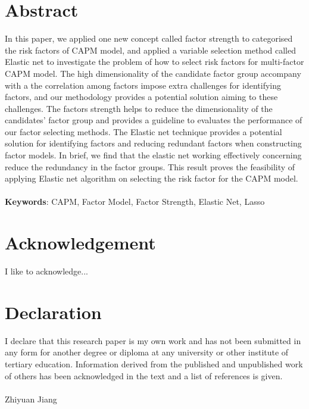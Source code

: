 \chapter*{Abstract}
In this paper, we applied one new concept called factor strength to categorised the risk factors of CAPM model, and applied a variable selection method called Elastic net to investigate the problem of how to select risk factors for multi-factor CAPM model.
The high dimensionality of the candidate factor group accompany with a the correlation among factors impose extra challenges for identifying factors, and our methodology provides a potential solution aiming to these challenges.
The factors strength helps to reduce the dimensionality of the candidates' factor group and provides a guideline to evaluates the performance of our factor selecting methods.
The Elastic net technique provides a potential solution for identifying factors and reducing redundant factors when constructing factor models.
In brief, we find that the elastic net working effectively concerning reduce the redundancy in the factor groups.
This result proves the feasibility of applying Elastic net algorithm on selecting the risk factor for the CAPM model.  \\
\vspace{0.5cm}\\
 \textbf{Keywords}: CAPM, Factor Model, Factor Strength, Elastic Net, Lasso


\chapter*{Acknowledgement}
I like to acknowledge...

\chapter*{Declaration}
I declare that this research paper is my own work and has not been submitted in any form for another degree or diploma at any university or other institute of tertiary education. Information derived from the published and unpublished work of others has been acknowledged in the text and a list of references is given.\\
\vspace{0.7cm}\\
Zhiyuan Jiang

